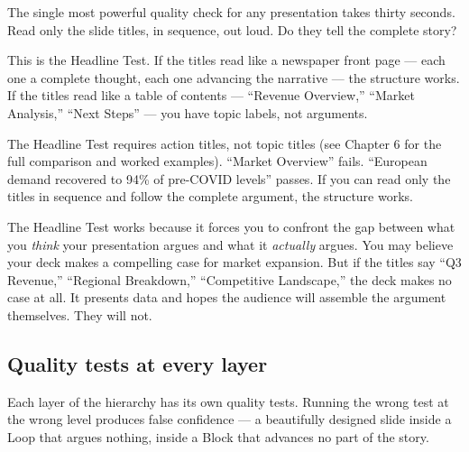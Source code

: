 
The single most powerful quality check for any presentation takes thirty seconds. Read only the slide titles, in sequence, out loud. Do they tell the complete story?

This is the Headline Test. If the titles read like a newspaper front page --- each one a complete thought, each one advancing the narrative --- the structure works. If the titles read like a table of contents --- ``Revenue Overview,'' ``Market Analysis,'' ``Next Steps'' --- you have topic labels, not arguments.

The Headline Test requires action titles, not topic titles (see Chapter 6 for the full comparison and worked examples). ``Market Overview'' fails. ``European demand recovered to 94\% of pre-COVID levels'' passes. If you can read only the titles in sequence and follow the complete argument, the structure works.

\begin{insightbox}
The Headline Test works because it forces you to confront the gap between what you \emph{think} your presentation argues and what it \emph{actually} argues. You may believe your deck makes a compelling case for market expansion. But if the titles say ``Q3 Revenue,'' ``Regional Breakdown,'' ``Competitive Landscape,'' the deck makes no case at all. It presents data and hopes the audience will assemble the argument themselves. They will not.
\end{insightbox}


\subsection{Quality tests at every layer}

Each layer of the hierarchy has its own quality tests. Running the wrong test at the wrong level produces false confidence --- a beautifully designed slide inside a Loop that argues nothing, inside a Block that advances no part of the story.

